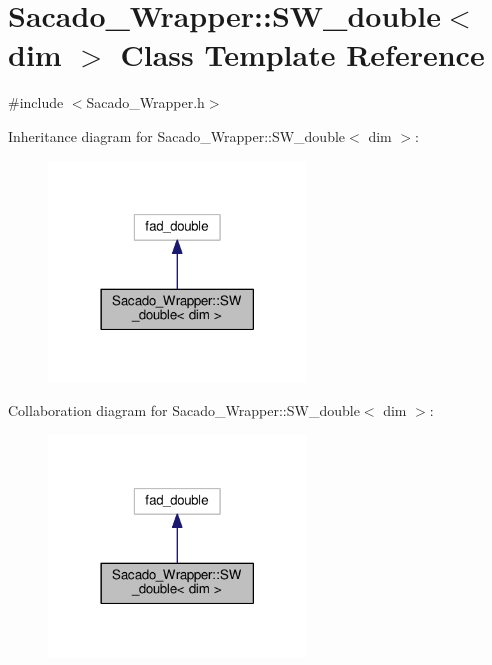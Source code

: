 \hypertarget{classSacado__Wrapper_1_1SW__double}{}\section{Sacado\+\_\+\+Wrapper\+:\+:S\+W\+\_\+double$<$ dim $>$ Class Template Reference}
\label{classSacado__Wrapper_1_1SW__double}


{\ttfamily \#include $<$Sacado\+\_\+\+Wrapper.\+h$>$}



Inheritance diagram for Sacado\+\_\+\+Wrapper\+:\+:S\+W\+\_\+double$<$ dim $>$\+:
\nopagebreak
\begin{figure}[H]
\begin{center}
\leavevmode
\includegraphics[width=194pt]{classSacado__Wrapper_1_1SW__double__inherit__graph}
\end{center}
\end{figure}


Collaboration diagram for Sacado\+\_\+\+Wrapper\+:\+:S\+W\+\_\+double$<$ dim $>$\+:
\nopagebreak
\begin{figure}[H]
\begin{center}
\leavevmode
\includegraphics[width=194pt]{classSacado__Wrapper_1_1SW__double__coll__graph}
\end{center}
\end{figure}
